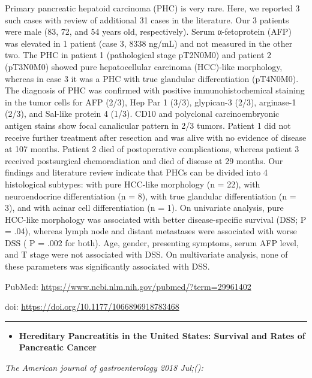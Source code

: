 \documentclass[]{article}
\providecommand{\tightlist}{%
  \setlength{\itemsep}{0pt}\setlength{\parskip}{0pt}}
\begin{document}
Primary pancreatic hepatoid carcinoma (PHC) is very rare. Here, we
reported 3 such cases with review of additional 31 cases in the
literature. Our 3 patients were male (83, 72, and 54 years old,
respectively). Serum α-fetoprotein (AFP) was elevated in 1 patient (case
3, 8338 ng/mL) and not measured in the other two. The PHC in patient 1
(pathological stage pT2N0M0) and patient 2 (pT3N0M0) showed pure
hepatocellular carcinoma (HCC)-like morphology, whereas in case 3 it was
a PHC with true glandular differentiation (pT4N0M0). The diagnosis of
PHC was confirmed with positive immunohistochemical staining in the
tumor cells for AFP (2/3), Hep Par 1 (3/3), glypican-3 (2/3), arginase-1
(2/3), and Sal-like protein 4 (1/3). CD10 and polyclonal
carcinoembryonic antigen stains show focal canalicular pattern in 2/3
tumors. Patient 1 did not receive further treatment after resection and
was alive with no evidence of disease at 107 months. Patient 2 died of
postoperative complications, whereas patient 3 received postsurgical
chemoradiation and died of disease at 29 months. Our findings and
literature review indicate that PHCs can be divided into 4 histological
subtypes: with pure HCC-like morphology (n = 22), with neuroendocrine
differentiation (n = 8), with true glandular differentiation (n = 3),
and with acinar cell differentiation (n = 1). On univariate analysis,
pure HCC-like morphology was associated with better disease-specific
survival (DSS; P = .04), whereas lymph node and distant metastases were
associated with worse DSS ( P = .002 for both). Age, gender, presenting
symptoms, serum AFP level, and T stage were not associated with DSS. On
multivariate analysis, none of these parameters was significantly
associated with DSS.

PubMed: \url{https://www.ncbi.nlm.nih.gov/pubmed/?term=29961402}

doi: \url{https://doi.org/10.1177/1066896918783468}

{}

{}

\begin{center}\rule{0.5\linewidth}{\linethickness}\end{center}

\begin{itemize}
\tightlist
\item
  \textbf{Hereditary Pancreatitis in the United States: Survival and
  Rates of Pancreatic Cancer}
\end{itemize}

\emph{The American journal of gastroenterology 2018 Jul;():}
\end{document}
